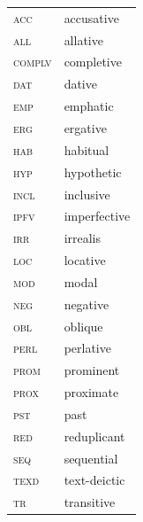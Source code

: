 \documentclass[12pt]{article}
\begin{document}
\footnotesize\begin{tabular}{ll}
	\textsc{acc}	&	accusative\\
	\textsc{all}	&	allative\\
	\textsc{complv}	&	completive\\
	\textsc{dat}	&	dative\\
	\textsc{emp}	&	emphatic\\
	\textsc{erg}	&	ergative\\
	\textsc{hab}	&	habitual\\
	\textsc{hyp}	&	hypothetic\\
	\textsc{incl}	&	inclusive\\
	\textsc{ipfv}	&	imperfective\\
	\textsc{irr}	&	irrealis\\
	\textsc{loc}	&	locative\\
	\textsc{mod}	&	modal\\
	\textsc{neg}	&	negative\\
	\textsc{obl}	&	oblique\\
	\textsc{perl}	&	perlative\\
	\textsc{prom}	&	prominent\\
	\textsc{prox}	&	proximate\\
	\textsc{pst}	&	past\\
	\textsc{red}	&	reduplicant\\
	\textsc{seq}	&	sequential\\
	\textsc{texd}	&	text-deictic\\
	\textsc{tr}	&	transitive\\
	
\end{tabular}
\end{document}
